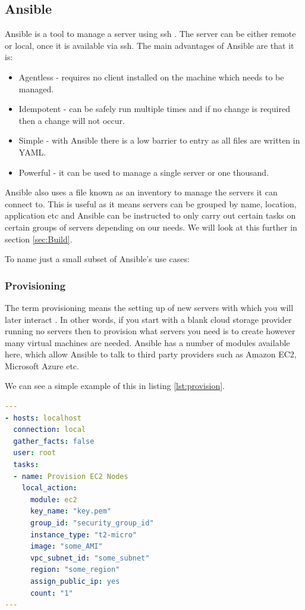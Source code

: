 \documentclass{article}
\begin{document}
\subsection{Ansible}
\label{sub:Ansible}
Ansible is a tool to manage a server using ssh \citep{Ansible2016}. The server can be either remote or local, once it is available via ssh. The main advantages of Ansible are that it is:

\begin{itemize}
  \item Agentless - requires no client installed on the machine which needs to be managed.
  \item Idempotent - can be safely run multiple times and if no change is required then a change will not occur.
  \item Simple - with Ansible there is a low barrier to entry as all files are written in YAML.
  \item Powerful - it can be used to manage a single server or one thousand. 
\end{itemize}

Ansible also uses a file known as an inventory to manage the servers it can connect to. This is useful as it means servers can be grouped by name, location, application etc and Ansible can be instructed to only carry out certain tasks on certain groups of servers depending on our needs. We will look at this further in section \ref{sec:Build}. 

To name just a small subset of Ansible's use cases:

\subsubsection{Provisioning}
The term provisioning means the setting up of new servers with which you will later interact \citep{Hochstein2015}. In other words, if you start with a blank cloud storage provider running no servers then to provision what servers you need is to create however many virtual machines are needed. Ansible has a number of modules available here, which allow Ansible to talk to third party providers such as Amazon EC2, Microsoft Azure etc. 

We can see a simple example of this in listing \ref{lst:provision}.

\begin{lstlisting}[float,floatplacement=!htbp,language=yaml,caption={Playbook To Create Instances On EC2},label={lst:provision},basicstyle=\scriptsize]
---
- hosts: localhost
  connection: local
  gather_facts: false
  user: root
  tasks:
  - name: Provision EC2 Nodes
    local_action:
      module: ec2
      key_name: "key.pem"
      group_id: "security_group_id"
      instance_type: "t2-micro"
      image: "some_AMI"
      vpc_subnet_id: "some_subnet"
      region: "some_region"
      assign_public_ip: yes
      count: "1"
---
\end{lstlisting}
\end{document}
